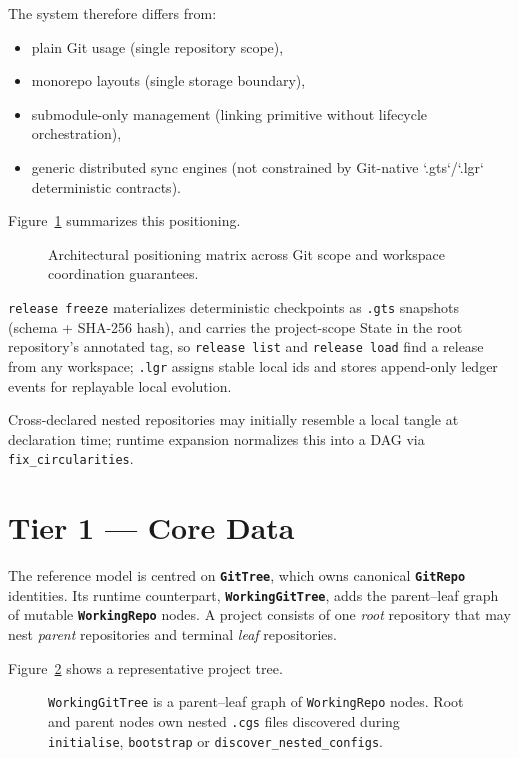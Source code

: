The system therefore differs from:
\begin{itemize}
  \item plain Git usage (single repository scope),
  \item monorepo layouts (single storage boundary),
  \item submodule-only management (linking primitive without lifecycle
    orchestration),
  \item generic distributed sync engines (not constrained by Git-native
    `.gts`/`.lgr` deterministic contracts).
\end{itemize}

Figure~\ref{fig:positioning-matrix} summarizes this positioning.

\begin{figure}[ht]
\centering
\caption{Architectural positioning matrix across Git scope and workspace
  coordination guarantees.}
\label{fig:positioning-matrix}

\end{figure}

\texttt{release freeze} materializes deterministic checkpoints as
\texttt{.gts} snapshots (schema + SHA-256 hash), and carries the
project-scope State in the root repository's annotated tag, so
\texttt{release list} and \texttt{release load} find a release from any
workspace; \texttt{.lgr}
assigns stable local ids and stores append-only ledger events for replayable
local evolution.

Cross-declared nested repositories may initially resemble a local tangle at
declaration time; runtime expansion normalizes this into a DAG via
\texttt{fix\_circularities}.

\section{Tier 1 — Core Data}
\label{sec:tier-core}

The reference model is centred on \textbf{\texttt{GitTree}}, which owns
canonical \textbf{\texttt{GitRepo}} identities. Its runtime counterpart,
\textbf{\texttt{WorkingGitTree}}, adds the parent--leaf graph of mutable
\textbf{\texttt{WorkingRepo}} nodes. A project consists of one \emph{root}
repository that may nest \emph{parent} repositories and terminal \emph{leaf}
repositories.

Figure~\ref{fig:gittree-nodes} shows a representative project tree.

\begin{figure}[ht]
\centering
\caption{\texttt{WorkingGitTree} is a parent--leaf graph of
  \texttt{WorkingRepo} nodes.
  Root and parent nodes own nested \texttt{.cgs} files discovered during
  \texttt{initialise}, \texttt{bootstrap} or \texttt{discover\_nested\_configs}.}
\label{fig:gittree-nodes}

\end{figure}

